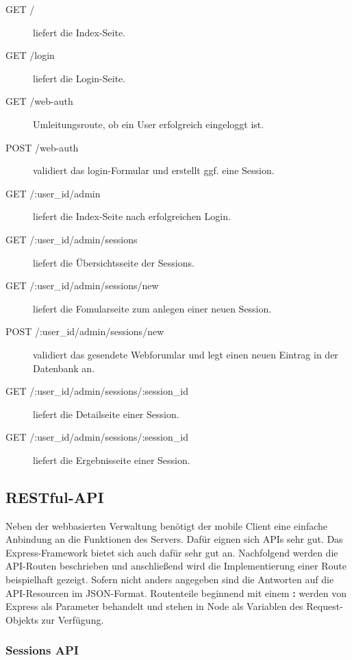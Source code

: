 \begin{description}

	\item[GET /] liefert die Index-Seite.
	\item[GET /login] liefert die Login-Seite.

	\item[GET /web-auth] Umleitungsroute, ob ein User erfolgreich eingeloggt ist.
	\item[POST /web-auth] validiert das login-Formular und erstellt ggf. eine Session.
	\item[GET /:user\_id/admin] liefert die Index-Seite nach erfolgreichen Login.
	\item[GET /:user\_id/admin/sessions] liefert die Übersichtsseite der Sessions.
	\item[GET /:user\_id/admin/sessions/new] liefert die Fomularseite zum anlegen einer neuen Session.
	\item[POST /:user\_id/admin/sessions/new] validiert das gesendete Webforumlar und legt einen neuen Eintrag in der Datenbank an.
	\item[GET /:user\_id/admin/sessions/:session\_id] liefert die Detailseite einer Session.
	\item[GET /:user\_id/admin/sessions/:session\_id] liefert die Ergebnisseite einer Session.
	
	
\end{description}

\subsection{RESTful-API \label{sec: api}}

Neben der webbasierten Verwaltung benötigt der mobile Client eine einfache Anbindung an die Funktionen des Servers. 
Dafür eignen sich \ac{API}s sehr gut. 
Das Express-Framework bietet sich auch dafür sehr gut an. 
Nachfolgend werden die \ac{API}-Routen beschrieben und anschließend wird die Implementierung einer Route beispielhaft gezeigt. 
Sofern nicht anders angegeben sind die Antworten auf die \ac{API}-Resourcen im \ac{JSON}-Format. 
Routenteile beginnend mit einem \textbf{:} werden von Express als Parameter behandelt und stehen in Node als Variablen des Request-Objekts zur Verfügung. 

\subsubsection{Sessions API}

